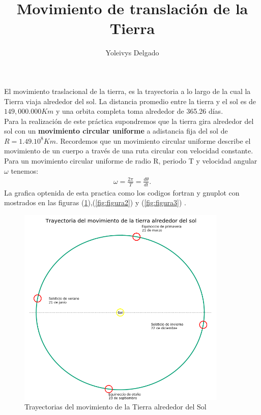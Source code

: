 \documentclass[12pt,a4paper,twoside]{article}
\author{Yoleivys Delgado}
\title{\textbf{Movimiento de translación de la Tierra}}
\begin{document}
\maketitle
El movimiento traslacional de la tierra, es la trayectoria a lo largo de la cual la Tierra viaja alrededor del sol. La distancia promedio entre la tierra y el sol es de $149,000.000 Km$ y una orbita completa toma alrededor de 365.26 días.\\
Para la realización de este práctica supondremos que la tierra gira alrededor del sol con un \textbf{movimiento circular uniforme } a adistancia fija del sol de $R = 1.49 . 10^{8} Km $.
Recordemos que un movimiento circular uniforme describe el movimiento de un cuerpo a través de una ruta circular con velocidad constante.\\
Para un movimiento circular uniforme de radio R, periodo T y velocidad angular $\omega$ tenemos:
\begin{eqnarray}
\omega = \frac{2 \pi}{T} = \frac{d\theta}{dt}.
\end{eqnarray}
La grafica optenida de esta practica como los codigos fortran y gnuplot con mostrados en las figuras (\ref{fig:figura1}),(\ref{fig:figura2}) y (\ref{fig:figura3}) . 
\newpage
\begin{figure}[h]
\centering
\includegraphics[width=10cm]{imagen.png} 
\caption{Trayectorias del movimiento de la Tierra alrededor del Sol}
\label{fig:figura1}
\end{figure}
\newpage
\end{document}
